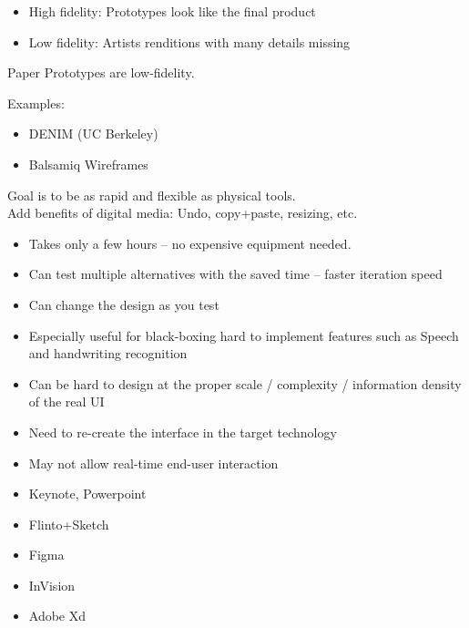 \begin{itemize}
    \item High fidelity: Prototypes look like the final product
    \item Low fidelity: Artists renditions with many details  missing
\end{itemize}

Paper Prototypes are low-fidelity. 

Examples:
\begin{itemize}
    \item DENIM (UC Berkeley)
    \item Balsamiq Wireframes
\end{itemize}
Goal is to be as rapid and flexible as physical tools.\\
Add benefits of digital media: Undo, copy+paste, resizing, etc.

\begin{itemize}
    \item Takes only a few hours -- no expensive equipment needed.
    \item Can test multiple alternatives with the saved time -- faster iteration speed
    \item Can change the design as you test
    \item Especially useful for black-boxing hard to implement features such as Speech and handwriting recognition
\end{itemize}

\begin{itemize}
    \item Can be hard to design at the proper scale / complexity  / information density of the real UI
    \item Need to re-create the interface in the target technology
    \item May not allow real-time end-user interaction
\end{itemize}

\begin{itemize}
    \item Keynote, Powerpoint
    \item Flinto+Sketch
    \item Figma
    \item InVision
    \item Adobe Xd
\end{itemize}

